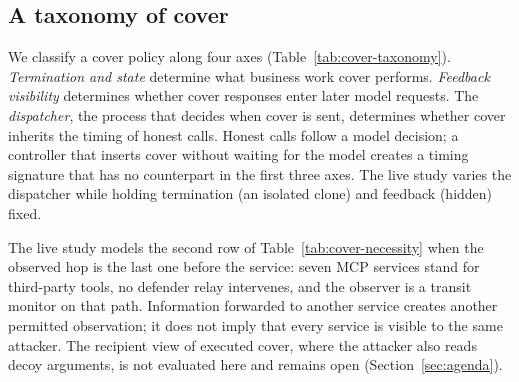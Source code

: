 

\subsection{A taxonomy of cover}\label{sec:cover-taxonomy}
We classify a cover policy along four axes (Table~\ref{tab:cover-taxonomy}). \emph{Termination and state} determine what business work cover performs. \emph{Feedback visibility} determines whether cover responses enter later model requests. The \emph{dispatcher}, the process that decides when cover is sent, determines whether cover inherits the timing of honest calls. Honest calls follow a model decision; a controller that inserts cover without waiting for the model creates a timing signature that has no counterpart in the first three axes. The live study varies the dispatcher while holding termination (an isolated clone) and feedback (hidden) fixed.



The live study models the second row of Table~\ref{tab:cover-necessity} when the observed hop is the last one before the service: seven MCP services stand for third-party tools, no defender relay intervenes, and the observer is a transit monitor on that path. Information forwarded to another service creates another permitted observation; it does not imply that every service is visible to the same attacker. The recipient view of executed cover, where the attacker also reads decoy arguments, is not evaluated here and remains open (Section~\ref{sec:agenda}).
